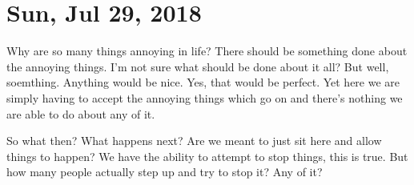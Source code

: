 \section{Sun, Jul 29, 2018}

Why are so many things annoying in life? There should be something done about the
annoying things. I'm not sure what should be done about it all? But well, soemthing.
Anything would be nice. Yes, that would be perfect. Yet here we are simply having to
accept the annoying things which go on and there's nothing we are able to do about
any of it.

So what then? What happens next? Are we meant to just sit here and allow things to
happen? We have the ability to attempt to stop things, this is true. But how many
people actually step up and try to stop it? Any of it?